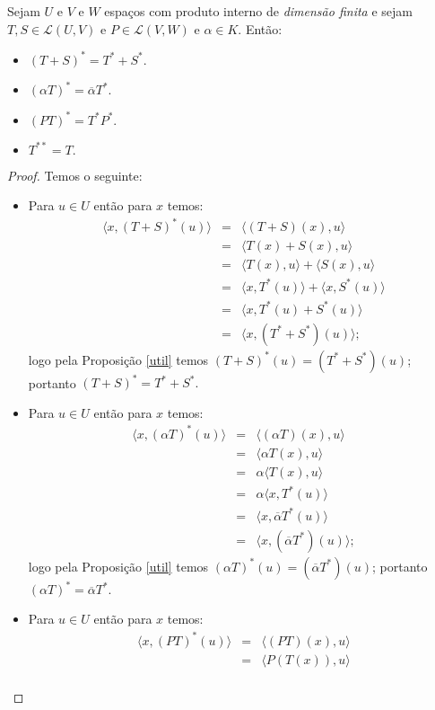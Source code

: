\documentclass[11pt,twoside,a4paper]{book}
\begin{document}
\begin{proposicao}
Sejam $U$ e $V$ e $W$ espaços com produto interno de \emph{dimensão finita} e sejam $T,S\in\mathcal{L}(U,V)$ e $P\in\mathcal{L}(V,W)$ e $\alpha\in K$. Então:
\begin{itemize}
\item $(T+S)^*=T^*+S^*.$
\item $(\alpha T)^*=\overline{\alpha}T^*.$
\item $(PT)^*=T^*P^*.$
\item $T^{**}=T.$
\end{itemize}
\end{proposicao}
\begin{proof}
Temos o seguinte:
\begin{itemize}
\item Para $u\in U$ então para $x$ temos:
\[
\begin{array}{rcl}
\langle x,(T+S)^*(u)\rangle&=&\langle (T+S)(x),u\rangle\\
&=&\langle T(x)+S(x),u\rangle\\
&=&\langle T(x),u\rangle+\langle S(x),u\rangle\\
&=&\langle x,T^*(u)\rangle+\langle x,S^*(u)\rangle\\
&=&\langle x,T^*(u)+S^*(u)\rangle\\
&=&\langle x,(T^*+S^*)(u)\rangle;
\end{array}
\]
logo pela Proposição \ref{util} temos $(T+S)^*(u)=(T^*+S^*)(u)$; portanto $(T+S)^*=T^*+S^*.$
\item Para $u\in U$ então para $x$ temos:
\[
\begin{array}{rcl}
\langle x,(\alpha T)^*(u)\rangle&=&\langle (\alpha T)(x),u\rangle\\
&=&\langle \alpha T(x),u\rangle\\
&=&\alpha\langle T(x),u\rangle\\
&=&\alpha\langle x,T^*(u)\rangle\\
&=&\langle x,\overline{\alpha}T^*(u)\rangle\\
&=&\langle x,(\overline{\alpha}T^*)(u)\rangle;
\end{array}
\]
logo pela Proposição \ref{util} temos $(\alpha T)^*(u)=(\overline{\alpha}T^*)(u)$; portanto $(\alpha T)^*=\overline{\alpha}T^*.$
\item Para $u\in U$ então para $x$ temos:
\[
\begin{array}{rcl}
\langle x,(PT)^*(u)\rangle&=&\langle (PT)(x),u\rangle\\
&=&\langle P(T(x)),u\rangle\\

\end{array}\]
\end{itemize}
\end{proof}
\end{document}
